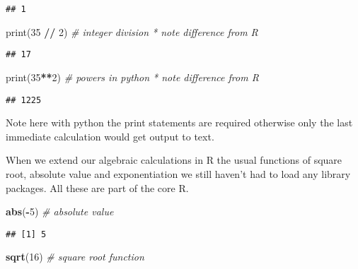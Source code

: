 \documentclass[]{book}
\newenvironment{Shaded}{\begin{snugshade}}{\end{snugshade}}
\newcommand{\KeywordTok}[1]{\textcolor[rgb]{0.13,0.29,0.53}{\textbf{#1}}}
\newcommand{\DecValTok}[1]{\textcolor[rgb]{0.00,0.00,0.81}{#1}}
\newcommand{\CommentTok}[1]{\textcolor[rgb]{0.56,0.35,0.01}{\textit{#1}}}
\newcommand{\OperatorTok}[1]{\textcolor[rgb]{0.81,0.36,0.00}{\textbf{#1}}}
\newcommand{\BuiltInTok}[1]{#1}
\newcommand{\NormalTok}[1]{#1}
\theoremstyle{definition}
\theoremstyle{definition}
\theoremstyle{definition}
\theoremstyle{remark}
\begin{document}
\begin{verbatim}
## 1
\end{verbatim}

\begin{Shaded}
\begin{Highlighting}[]
\BuiltInTok{print}\NormalTok{(}\DecValTok{35} \OperatorTok{//} \DecValTok{2}\NormalTok{)    }\CommentTok{# integer division       * note difference from R}
\end{Highlighting}
\end{Shaded}

\begin{verbatim}
## 17
\end{verbatim}

\begin{Shaded}
\begin{Highlighting}[]
\BuiltInTok{print}\NormalTok{(}\DecValTok{35}\OperatorTok{**}\DecValTok{2}\NormalTok{)      }\CommentTok{# powers in python     * note difference from R}
\end{Highlighting}
\end{Shaded}

\begin{verbatim}
## 1225
\end{verbatim}

Note here with python the print statements are required otherwise only
the last immediate calculation would get output to text.

When we extend our algebraic calculations in R the usual functions of
square root, absolute value and exponentiation we still haven't had to
load any library packages. All these are part of the core R.

\begin{Shaded}
\begin{Highlighting}[]
\KeywordTok{abs}\NormalTok{(}\OperatorTok{-}\DecValTok{5}\NormalTok{)          }\CommentTok{# absolute value}
\end{Highlighting}
\end{Shaded}

\begin{verbatim}
## [1] 5
\end{verbatim}

\begin{Shaded}
\begin{Highlighting}[]
\KeywordTok{sqrt}\NormalTok{(}\DecValTok{16}\NormalTok{)         }\CommentTok{# square root function}
\end{Highlighting}
\end{Shaded}
\end{document}
